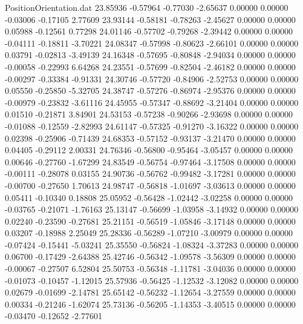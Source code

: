 \begin{filecontents}{PositionOrientation.dat}
  23.85936   -0.57964   -0.77030    -2.65637    0.00000    0.00000   -0.03006   -0.17105    2.77609
  23.93144   -0.58181   -0.78263    -2.45627    0.00000    0.00000    0.05988   -0.12561    0.77298
  24.01146   -0.57702   -0.79268    -2.39442    0.00000    0.00000   -0.04111   -0.18811   -3.70221
  24.08347   -0.57998   -0.80623    -2.66101    0.00000    0.00000    0.03791   -0.02813   -3.49139
  24.16348   -0.57695   -0.80848    -2.94034    0.00000    0.00000   -0.00058   -0.22993    6.64268
  24.23551   -0.57699   -0.82504    -2.46182    0.00000    0.00000   -0.00297   -0.33384   -0.91331
  24.30746   -0.57720   -0.84906    -2.52753    0.00000    0.00000    0.05550   -0.25850   -5.32705
  24.38747   -0.57276   -0.86974    -2.95376    0.00000    0.00000   -0.00979   -0.23832   -3.61116
  24.45955   -0.57347   -0.88692    -3.21404    0.00000    0.00000    0.01510   -0.21871    3.84901
  24.53153   -0.57238   -0.90266    -2.93698    0.00000    0.00000   -0.01088   -0.12559   -2.82993
  24.61147   -0.57325   -0.91270    -3.16322    0.00000    0.00000    0.02398   -0.25906   -0.71439
  24.68353   -0.57152   -0.93137    -3.21470    0.00000    0.00000    0.04405   -0.29112    2.00331
  24.76346   -0.56800   -0.95464    -3.05457    0.00000    0.00000    0.00646   -0.27760   -1.67299
  24.83549   -0.56754   -0.97464    -3.17508    0.00000    0.00000   -0.00111   -0.28078    0.03155
  24.90736   -0.56762   -0.99482    -3.17281    0.00000    0.00000   -0.00700   -0.27650    1.70613
  24.98747   -0.56818   -1.01697    -3.03613    0.00000    0.00000    0.05411   -0.10340    0.18808
  25.05952   -0.56428   -1.02442    -3.02258    0.00000    0.00000   -0.03765   -0.21071   -1.76163
  25.13147   -0.56699   -1.03958    -3.14932    0.00000    0.00000    0.02240   -0.23590   -0.27681
  25.21151   -0.56519   -1.05846    -3.17148    0.00000    0.00000    0.03207   -0.18988    2.25049
  25.28336   -0.56289   -1.07210    -3.00979    0.00000    0.00000   -0.07424   -0.15441   -5.03241
  25.35550   -0.56824   -1.08324    -3.37283    0.00000    0.00000    0.06700   -0.17429   -2.64388
  25.42746   -0.56342   -1.09578    -3.56309    0.00000    0.00000   -0.00067   -0.27507    6.52804
  25.50753   -0.56348   -1.11781    -3.04036    0.00000    0.00000   -0.01073   -0.10457   -1.12015
  25.57936   -0.56425   -1.12532    -3.12082    0.00000    0.00000    0.02679   -0.01699   -2.14781
  25.65142   -0.56232   -1.12654    -3.27559    0.00000    0.00000    0.00334   -0.21246   -1.62074
  25.73136   -0.56205   -1.14353    -3.40515    0.00000    0.00000   -0.03470   -0.12652   -2.77601

\end{filecontents}
